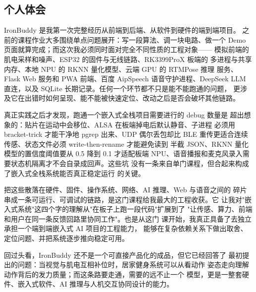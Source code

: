 \subsection{个人体会}

IronBuddy 是我第一次完整经历从前端到后端、从软件到硬件的端到端项目。
之前的课程作业大多围绕单点问题展开：写一段算法、调一块电路、做一个
Demo 页面就算完成；而这次我必须同时面对完全不同性质的工程对象——
模拟前端的肌电采样和噪声、ESP32 的固件与无线链路、RK3399ProX 板端的
多进程与共享内存、本地 NPU 的 RKNN 量化模型、云端 GPU 的 RTMPose 推理
服务、Flask Web 服务和 PWA 前端、百度 AipSpeech 语音守护进程、DeepSeek
LLM 直连，以及 SQLite 长期记录。任何一个环节都不只是能不能跑通的问题，
更涉及它在出错时如何呈现、能不能被快速定位、改动之后是否会破坏其他链路。

真正实践之后才发现，跑通一个嵌入式全栈项目需要进行的 debug 数量是
超出想象的：贴片在运动中会移位、ALSA 在板端掉电后默认静音、子进程
必须用 bracket-trick 才能干净地 pgrep 出来、UDP 偶尔丢包却比 BLE
重传更适合连续传感、状态文件必须 write-then-rename 才能避免读到
半截 JSON、RKNN 量化模型的置信度阈值要从 0.5 降到 0.1 才适配板端
NPU、语音播报和麦克风录入需要状态机隔离才不会自录成回声。这些坑
没有一条来自单门课程，但合起来构成了嵌入式全栈系统能否真正稳定运行
的关键。

把这些散落在硬件、固件、操作系统、网络、AI 推理、Web 与语音之间的
碎片串成一条可运行、可调试的链路，是这门课程给我最大的工程收获。它
让我对"嵌入式系统"这四个字的理解从"在板子上跑一段代码"扩展到了
"让传感、算力、前端和用户在同一条反馈回路里协同工作"。也是从这门
课开始，我真正具备了去独立承担一个端到端嵌入式 AI 项目的工程能力，
能够在复杂依赖关系下做出取舍、定位问题、并把系统逐步推向稳定可用。

回过头看，IronBuddy 还不是一个可直接产品化的成品，但它已经回答了
最初提出的问题：当视觉与肌电互相补位时，居家健身系统可以从看动作
姿态走向理解动作背后的发力质量；而这条路要走通，需要的远不止一个
模型，更是一整套硬件、嵌入式软件、AI 推理与人机交互协同设计的能力。

